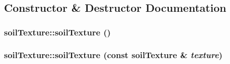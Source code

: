 \subsection{Constructor \& Destructor Documentation}
\hypertarget{classsoil_texture_a9254dd3e775bff9fc9a8b659ecb71b95}{
\subsubsection[{soilTexture}]{\setlength{\rightskip}{0pt plus 5cm}soilTexture::soilTexture ()}}
\label{classsoil_texture_a9254dd3e775bff9fc9a8b659ecb71b95}
\hypertarget{classsoil_texture_af5fc74e4192be1b4a75d79727f3c5e92}{
\subsubsection[{soilTexture}]{\setlength{\rightskip}{0pt plus 5cm}soilTexture::soilTexture (const {\bf soilTexture} \& {\em texture})}}
\label{classsoil_texture_af5fc74e4192be1b4a75d79727f3c5e92}


